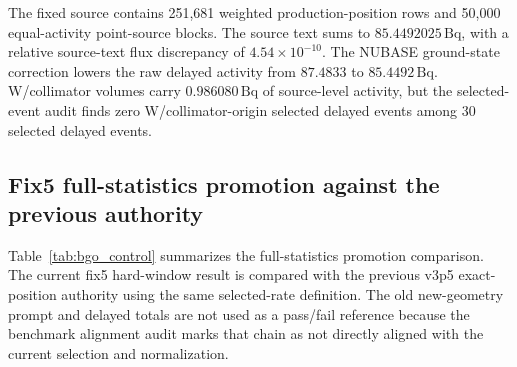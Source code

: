 \documentclass[preprint,12pt]{elsarticle}
\begin{document}
The fixed source contains 251,681 weighted production-position rows and 50,000 equal-activity point-source blocks. The source text sums to $85.4492025\,\mathrm{Bq}$, with a relative source-text flux discrepancy of $4.54\times10^{-10}$. The NUBASE ground-state correction lowers the raw delayed activity from $87.4833$ to $85.4492\,\mathrm{Bq}$. W/collimator volumes carry $0.986080\,\mathrm{Bq}$ of source-level activity, but the selected-event audit finds zero W/collimator-origin selected delayed events among 30 selected delayed events.

\begin{table}[t]
\centering
\caption{Current fix5 delayed-source inventory and selected-event audits.}
\label{tab:convergence}
\end{table}

\subsection{Fix5 full-statistics promotion against the previous authority}
\label{subsec:fix5_promotion}

Table~\ref{tab:bgo_control} summarizes the full-statistics promotion comparison. The current fix5 hard-window result is compared with the previous v3p5 exact-position authority using the same selected-rate definition. The old new-geometry prompt and delayed totals are not used as a pass/fail reference because the benchmark alignment audit marks that chain as not directly aligned with the current selection and normalization.
\end{document}
